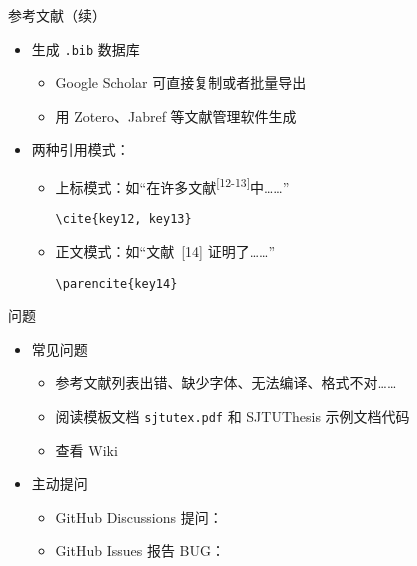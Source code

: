 \begin{frame}[fragile]{参考文献（续）}
  \begin{itemize}
    \item 生成 \verb|.bib| 数据库
          \begin{itemize}
            \item Google Scholar 可直接复制或者批量导出
            \item 用 Zotero、Jabref 等文献管理软件生成
          \end{itemize}
    \item 两种引用模式：
          \begin{itemize}
            \item 上标模式：如“在许多文献\textsuperscript{[12-13]}中……”
                  \begin{lstlisting}[basicstyle=\ttfamily]
    \cite{key12, key13}
          \end{lstlisting}
            \item 正文模式：如“文献~[14] 证明了……”
                  \begin{lstlisting}[basicstyle=\ttfamily]
    \parencite{key14}
          \end{lstlisting}
          \end{itemize}
  \end{itemize}
\end{frame}

\begin{frame}[fragile]{\SJTUThesis 问题}
  \begin{itemize}
    \item 常见问题
          \begin{itemize}
            \item 参考文献列表出错、缺少字体、无法编译、格式不对……
            \item 阅读模板文档 \verb|sjtutex.pdf| 
                  和 SJTUThesis 示例文档代码
            \item 查看 Wiki 
          \end{itemize}

    \item 主动提问
          \begin{itemize}
            \item GitHub Discussions 提问：
            \item GitHub Issues 报告 BUG：
          \end{itemize}

  \end{itemize}
\end{frame}
